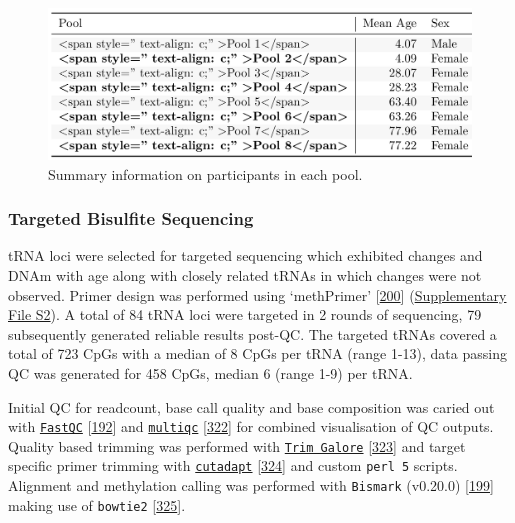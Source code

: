 \documentclass[
]{book}
\begin{document}
\begin{figure}

{\centering \includegraphics[width=1\linewidth]{figs/poolSummaryTable} 

}

\caption{Summary information on participants in each pool.}\label{fig:poolSummaryTable}
\end{figure}



\hypertarget{targetedBiSseq}{%
\subsubsection{Targeted Bisulfite Sequencing}\label{targetedBiSseq}}

tRNA loci were selected for targeted sequencing which exhibited changes and DNAm with age along with closely related tRNAs in which changes were not observed.
Primer design was performed using `methPrimer' {[}\protect\hyperlink{ref-Li2002}{200}{]} (\href{./Supplementary_Files/Targeted_BiS-seq_Primers.txt}{Supplementary File S2}).
A total of 84 tRNA loci were targeted in 2 rounds of sequencing, 79 subsequently generated reliable results post-QC.
The targeted tRNAs covered a total of 723 CpGs with a median of 8 CpGs per tRNA (range 1-13), data passing QC was generated for 458 CpGs, median 6 (range 1-9) per tRNA.

Initial QC for readcount, base call quality and base composition was caried out with \href{https://github.com/s-andrews/FastQC}{\texttt{FastQC}} {[}\protect\hyperlink{ref-Andrews2010}{192}{]} and \href{https://github.com/ewels/MultiQC}{\texttt{multiqc}} {[}\protect\hyperlink{ref-Ewels2016}{322}{]} for combined visualisation of QC outputs.
Quality based trimming was performed with \href{https://github.com/FelixKrueger/TrimGalore}{\texttt{Trim\ Galore}} {[}\protect\hyperlink{ref-Krueger2015}{323}{]} and target specific primer trimming with \href{https://github.com/marcelm/cutadapt}{\texttt{cutadapt}} {[}\protect\hyperlink{ref-Martin2011}{324}{]} and custom \texttt{perl\ 5} scripts.
Alignment and methylation calling was performed with \texttt{Bismark} (v0.20.0) {[}\protect\hyperlink{ref-Krueger2011}{199}{]} making use of \texttt{bowtie2} {[}\protect\hyperlink{ref-Langmead2012}{325}{]}.
\end{document}
